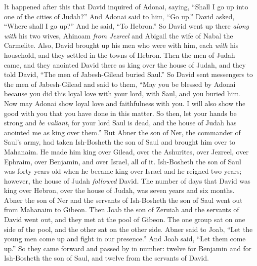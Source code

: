 \begin{biblechapter} %
 It happened after this that David inquired of Adonai, saying, “Shall I go up into one of the cities of Judah?” And Adonai said to him, “Go up.” David asked, “Where shall I go up?” And he said, “To Hebron.”
\verse So David went up there \textit{along with} his two wives, Ahinoam \textit{from Jezreel} and Abigail the wife of Nabal the Carmelite.
\verse Also, David brought up his men who were with him, each \textit{with} his household, and they settled in the towns of Hebron.
 Then the men of Judah came, and they anointed David there as king over the house of Judah, and they told David, “The men of Jabesh-Gilead buried Saul.”
\verse So David sent messengers to the men of Jabesh-Gilead and said to them, “May you be blessed by Adonai because you did this loyal love with your lord, with Saul, and you buried him.
\verse Now may Adonai show loyal love and faithfulness with you. I will also show the good with you that you have done in this matter.
\verse So then, let your hands be strong and \textit{be valiant}, for your lord Saul is dead, and the house of Judah has anointed me as king over them.”
 But Abner the son of Ner, the commander of Saul’s army, had taken Ish-Bosheth the son of Saul and brought him over to Mahanaim.
\verse He made him king over Gilead, over the Ashurites, over Jezreel, over Ephraim, over Benjamin, and over Israel, all of it.
\verse Ish-Bosheth the son of Saul was forty years old when he became king over Israel and he reigned two years; however, the house of Judah \textit{followed} David.
\verse The number of days that David was king over Hebron, over the house of Judah, was seven years and six months.
 Abner the son of Ner and the servants of Ish-Bosheth the son of Saul went out from Mahanaim to Gibeon.
\verse Then Joab the son of Zeruiah and the servants of David went out, and they met at the pool of Gibeon. The one group sat on one side of the pool, and the other sat on the other side.
\verse Abner said to Joab, “Let the young men come up and fight in our presence.” And Joab said, “Let them come up.”
\verse So they came forward and passed by in number: twelve for Benjamin and for Ish-Bosheth the son of Saul, and twelve from the servants of David.

\end{biblechapter}
